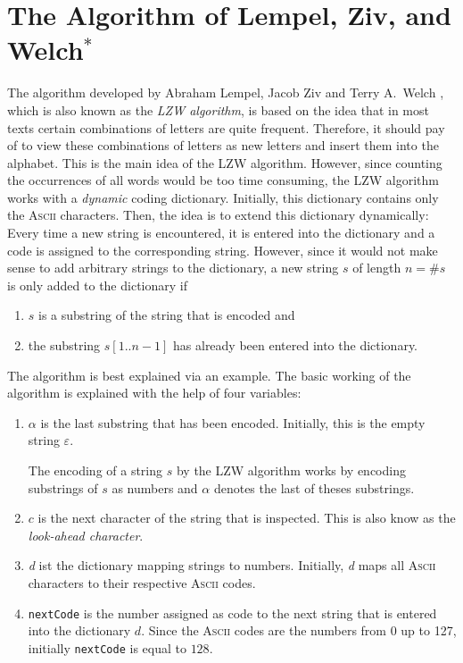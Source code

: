 \section[LZW Algorithm$^*$]{The Algorithm  of Lempel, Ziv, and Welch$^*$}
The algorithm developed by Abraham Lempel, Jacob Ziv \cite{ziv:77,ziv:78} and Terry A.~Welch
\cite{welch:84}, which is also known as the \emph{LZW algorithm}, is based on the idea that in most
texts certain combinations of letters are quite frequent.  Therefore, it should pay of to view
these combinations of letters as new letters and insert them into the alphabet.  This is the main
idea of the LZW algorithm.  However, since counting the occurrences of all words would be too time
consuming, the LZW algorithm works with a \emph{dynamic} coding dictionary.  Initially, this dictionary
contains only the \textsc{Ascii} characters.  Then, the idea is to extend this dictionary
dynamically: Every time a new string is encountered, it is entered into the dictionary and a code is
assigned to the corresponding string.  However, since it would not make sense to add arbitrary
strings to the dictionary, a new string $s$ of length $n=\#s$ is only added to the dictionary if
\begin{enumerate}
\item $s$ is a substring of the string that is encoded and
\item the substring $s[1..n-1]$ has already been entered into the dictionary.  
\end{enumerate} 
The algorithm is best
explained via an example.  The basic working of the algorithm is explained with the help of four
variables:
\begin{enumerate}
\item $\alpha$ is the last substring that has been encoded.  Initially, this is the empty string
      $\varepsilon$.
  
      The encoding of a string $s$ by the LZW algorithm works by encoding substrings of $s$ as
      numbers and $\alpha$ denotes the last of theses substrings.
\item $c$ is the next character of the string that is inspected.  This is also know as the
      \emph{look-ahead character}.
\item \textsl{d} ist the dictionary mapping strings to numbers.  Initially, \textsl{d} maps all
      \textsc{Ascii} characters to their respective \textsc{Ascii} codes.
\item \texttt{nextCode} is the number assigned as code to the next string that is entered into
      the dictionary $d$.  Since the \textsc{Ascii} codes are the numbers from 0 up to 127,
      initially \texttt{nextCode} is equal to $128$.
\end{enumerate}
